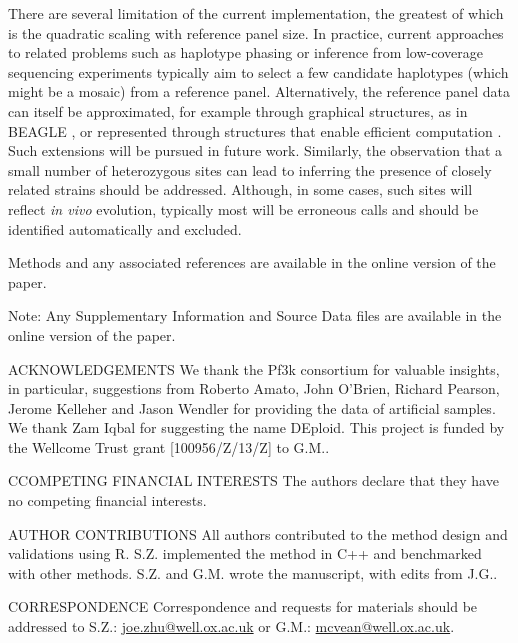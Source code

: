 \documentclass{nature}
\begin{document}
There are several limitation of the current implementation, the greatest of which is the quadratic scaling with reference panel size.  In practice, current approaches to related problems such as haplotype phasing \cite{Delaneau2012} or inference from low-coverage sequencing experiments \cite{Davis2016} typically aim to select a few candidate haplotypes (which might be a mosaic) from a reference panel.  Alternatively, the reference panel data can itself be approximated, for example through graphical structures, as in BEAGLE \cite{Browning2007}, or represented through structures that enable efficient computation \cite{Lunter2016}.  Such extensions will be pursued in future work.  Similarly, the observation that a small number of heterozygous sites can lead to inferring the presence of closely related strains should be addressed. Although, in some cases, such sites will reflect {\it in vivo} evolution, typically most will be erroneous calls and should be identified automatically and excluded.

\begin{methods}
Methods and any associated references are available in the online version of the paper.

\noindent Note: Any Supplementary Information and Source Data files are available in the online version of the paper.
\end{methods}


\begin{addendum}
 \item[ACKNOWLEDGEMENTS] We thank the Pf3k consortium for valuable insights, in particular, suggestions from Roberto Amato, John O'Brien, Richard Pearson, Jerome Kelleher and Jason Wendler for providing the data of artificial samples. We thank Zam Iqbal for suggesting the name DEploid. This project is funded by the Wellcome Trust grant [100956/Z/13/Z] to G.M..
 \item[CCOMPETING FINANCIAL INTERESTS] The authors declare that they have no competing financial interests.
 \item[AUTHOR CONTRIBUTIONS] All authors contributed to the method design and validations using R. S.Z. implemented the method in C++ and benchmarked with other methods. S.Z. and G.M. wrote the manuscript, with edits from J.G..
 \item[CORRESPONDENCE] Correspondence and requests for materials should be addressed to S.Z.: \href{joe.zhu@well.ox.ac.uk}{joe.zhu@well.ox.ac.uk} or G.M.: \href{mcvean@well.ox.ac.uk}{mcvean@well.ox.ac.uk}.

\end{addendum}
\end{document}
